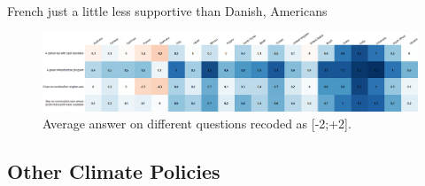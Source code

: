 \begin{framefont}{\small}
\begin{frame}{French just a little less supportive than Danish, Americans}%
\begin{figure}[h!]
\centering
\caption{Average answer on different questions recoded as [-2;+2].}
\includegraphics[width=\paperwidth]{../figures/country_comparison/policies_all_support_mean_countries.png}
\end{figure}
\end{frame}
\subsection{Other Climate Policies}


\end{framefont}
